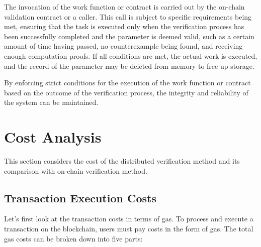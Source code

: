 \documentclass[runningheads]{llncs}
\begin{document}
The invocation of the work function or contract is carried out by the on-chain validation contract or a caller. This call is subject to specific requirements being met, ensuring that the task is executed only when the verification process has been successfully completed and the parameter is deemed valid, such as a certain amount of time having passed, no counterexample being found, and receiving enough computation proofs. If all conditions are met, the actual work is executed, and the record of the parameter may be deleted from memory to free up storage.

By enforcing strict conditions for the execution of the work function or contract based on the outcome of the verification process, the integrity and reliability of the system can be maintained.



 
\section{Cost Analysis}
This section considers the cost of the distributed verification method and its comparison with on-chain verification method.

\subsection{Transaction Execution Costs}
Let's first look at the transaction costs in terms of gas. To process and execute a transaction on the blockchain, users must pay costs in the form of gas. The total gas costs can be broken down into five parts:
\end{document}
